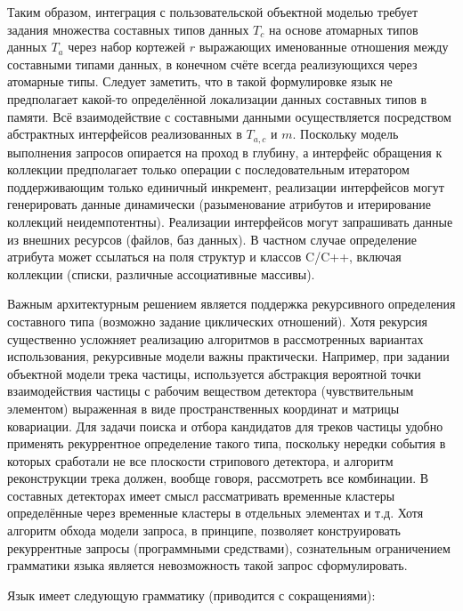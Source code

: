 Таким образом, интеграция с пользовательской объектной моделью требует задания
множества составных типов данных $T_c$ на основе атомарных типов данных $T_a$ через
набор кортежей $r$ выражающих именованные отношения между составными типами данных,
в конечном счёте всегда реализующихся через атомарные типы. Следует заметить, что
в такой формулировке язык не предполагает какой-то определённой локализации данных
составных типов в памяти. Всё взаимодействие с составными данными осуществляется посредством
абстрактных интерфейсов реализованных в $T_{a,c}$ и $m$. Поскольку модель выполнения
запросов опирается на проход в глубину, а интерфейс обращения к коллекции предполагает
только операции с последовательным итератором поддерживающим только единичный инкремент,
реализации интерфейсов могут генерировать данные динамически (разыменование
атрибутов и итерирование коллекций неидемпотентны).
Реализации интерфейсов могут запрашивать данные из внешних ресурсов (файлов, баз данных).
В частном случае определение атрибута может ссылаться на поля структур и классов C/C++,
включая коллекции (списки, различные ассоциативные массивы).

Важным архитектурным решением является поддержка рекурсивного определения составного
типа (возможно задание циклических отношений). Хотя рекурсия существенно усложняет
реализацию алгоритмов в рассмотренных
вариантах использования, рекурсивные модели важны практически. Например,
при задании объектной модели трека частицы, используется абстракция вероятной
точки взаимодействия частицы с рабочим веществом детектора (чувствительным
элементом) выраженная в виде пространственных координат и матрицы ковариации.
Для задачи поиска и отбора кандидатов для треков частицы удобно
применять рекуррентное определение такого типа, поскольку нередки события в
которых сработали не все плоскости стрипового детектора, и алгоритм
реконструкции трека должен, вообще говоря, рассмотреть все комбинации. В
составных детекторах имеет смысл рассматривать временные кластеры
определённые через временные кластеры в отдельных элементах и т.д.
Хотя алгоритм обхода модели запроса, в принципе, позволяет конструировать рекуррентные
запросы (программными средствами), сознательным ограничением грамматики
языка является невозможность такой запрос сформулировать.

Язык имеет следующую грамматику (приводится с сокращениями):

